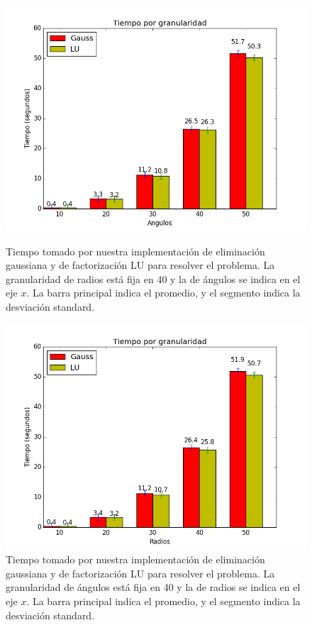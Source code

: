 \begin{figure}[H]
\centering
\begin{minipage}{0.48\textwidth}
  \centering
    \includegraphics[width=1\textwidth]{imgs/tiempos_vanilla_angulos.png}
  \caption{\footnotesize{Tiempo tomado por nuestra implementación de eliminación gaussiana y de factorización LU para resolver el problema. La granularidad de radios está fija en 40 y la de ángulos se indica en el eje $x$. La barra principal indica el promedio, y el segmento indica la desviación standard.}}
  \label{fig:tiempo1}
\end{minipage}%
\hspace{0.03\textwidth}
\begin{minipage}{0.48\textwidth}   
  \centering
    \includegraphics[width=1\textwidth]{imgs/tiempos_vanilla_radios.png} 
  \caption{\footnotesize{Tiempo tomado por nuestra implementación de eliminación gaussiana y de factorización LU para resolver el problema. La granularidad de ángulos está fija en 40 y la de radios se indica en el eje $x$. La barra principal indica el promedio, y el segmento indica la desviación standard.}}
  \label{fig:tiempo2}
\end{minipage}
\end{figure}



